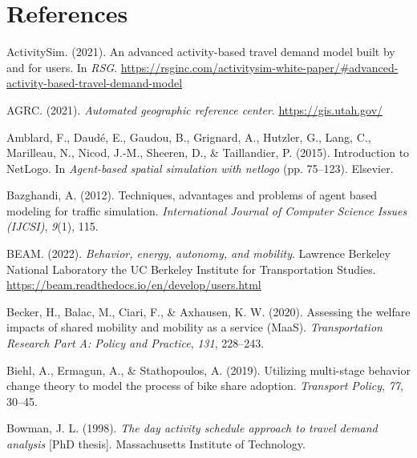 \documentclass[fancy, masters]{byuthesis}
\newlength{\cslhangindent}
\newlength{\cslentryspacingunit} %
\newenvironment{CSLReferences}[2] %
 {%
  \setlength{\parindent}{0pt}
  \ifodd #1
  \let\oldpar\par
  \def\par{\hangindent=\cslhangindent\oldpar}
  \fi
  \setlength{\parskip}{#2\cslentryspacingunit}
 }%
 {}
\begin{document}
\hypertarget{references}{%
\chapter*{References}\label{references}}

\hypertarget{refs}{}
\begin{CSLReferences}{1}{0}
\leavevmode{}%
ActivitySim. (2021). An advanced activity-based travel demand model built by and for users. In \emph{RSG}. \url{https://rsginc.com/activitysim-white-paper/\#advanced-activity-based-travel-demand-model}

\leavevmode{}%
AGRC. (2021). \emph{Automated geographic reference center}. \url{https://gis.utah.gov/}

\leavevmode{}%
Amblard, F., Daudé, E., Gaudou, B., Grignard, A., Hutzler, G., Lang, C., Marilleau, N., Nicod, J.-M., Sheeren, D., \& Taillandier, P. (2015). Introduction to NetLogo. In \emph{Agent-based spatial simulation with netlogo} (pp. 75--123). Elsevier.

\leavevmode{}%
Bazghandi, A. (2012). Techniques, advantages and problems of agent based modeling for traffic simulation. \emph{International Journal of Computer Science Issues (IJCSI)}, \emph{9}(1), 115.

\leavevmode{}%
BEAM. (2022). \emph{Behavior, energy, autonomy, and mobility}. Lawrence Berkeley National Laboratory the UC Berkeley Institute for Transportation Studies. \url{https://beam.readthedocs.io/en/develop/users.html}

\leavevmode{}%
Becker, H., Balac, M., Ciari, F., \& Axhausen, K. W. (2020). Assessing the welfare impacts of shared mobility and mobility as a service (MaaS). \emph{Transportation Research Part A: Policy and Practice}, \emph{131}, 228--243.

\leavevmode{}%
Biehl, A., Ermagun, A., \& Stathopoulos, A. (2019). Utilizing multi-stage behavior change theory to model the process of bike share adoption. \emph{Transport Policy}, \emph{77}, 30--45.

\leavevmode{}%
Bowman, J. L. (1998). \emph{The day activity schedule approach to travel demand analysis} {[}PhD thesis{]}. Massachusetts Institute of Technology.


\end{CSLReferences}
\end{document}
